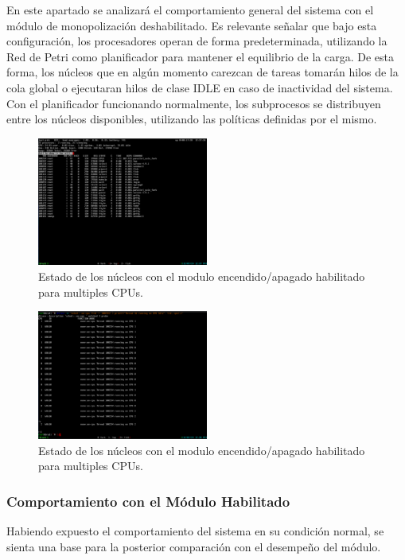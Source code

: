 En este apartado se analizará el comportamiento general del sistema con el módulo de monopolización deshabilitado. Es relevante señalar que bajo esta configuración, los procesadores operan de forma predeterminada, utilizando la Red de Petri como planificador para mantener el equilibrio de la carga. De esta forma, los núcleos que en algún momento carezcan de tareas tomarán hilos de la cola global o ejecutaran hilos de clase IDLE en caso de inactividad del sistema. Con el planificador funcionando normalmente, los subprocesos se distribuyen entre los núcleos disponibles, utilizando las políticas definidas por el mismo.\par

\begin{figure}[H]
    \centering
    \includegraphics[width=0.5\textwidth]{images/top_disabled.png}
    \caption{Estado de los núcleos con el modulo encendido/apagado habilitado para multiples CPUs.}
    \label{fig:top_disabled}
\end{figure}

\begin{figure}[H]
    \centering
    \includegraphics[width=0.5\textwidth]{images/dtrace_disabled.png}
    \caption{Estado de los núcleos con el modulo encendido/apagado habilitado para multiples CPUs.}
    \label{fig:dtrace_disabled}
\end{figure}


\subsubsection{Comportamiento con el Módulo Habilitado}
Habiendo expuesto el comportamiento del sistema en su condición normal, se sienta una base para la posterior comparación con el desempeño del módulo.\par

